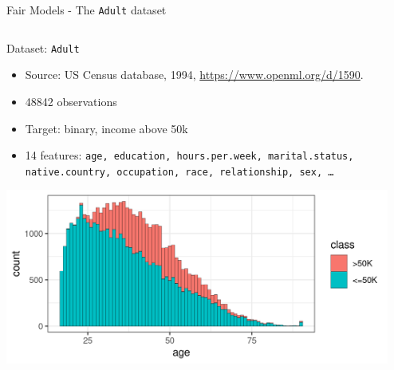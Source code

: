 \documentclass[11pt,compress,t,notes=noshow,xcolor=table]{beamer}
\begin{document}


\begin{vbframe}{Fair Models - The \texttt{Adult} dataset}

\begin{columns}
\begin{column}{0.5\textwidth}
Dataset: \texttt{Adult}
\begin{itemize}
  \scriptsize
  \item  Source: US Census database, 1994, \url{https://www.openml.org/d/1590}.
  \item 48842 observations
  \item Target: binary, income above 50k
  \item 14 features: \texttt{age, education, hours.per.week, marital.status, native.country, occupation, race, relationship, sex, \ldots}
\end{itemize}
\includegraphics[width=0.99\textwidth]{figure_man/dataset_adult_age_sex.png}
\end{column}%
\begin{column}{0.5\textwidth}


\end{column}
\end{columns}
\end{vbframe}
\end{document}
